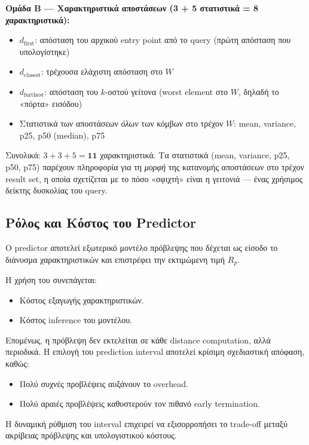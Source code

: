 \documentclass[12pt,a4paper]{article}
\begin{document}
\textbf{Ομάδα Β — Χαρακτηριστικά αποστάσεων (3 + 5 στατιστικά = 8 χαρακτηριστικά):}
\begin{itemize}
    \item $d_{\text{first}}$: απόσταση του αρχικού entry point από το query (πρώτη απόσταση που υπολογίστηκε)
    \item $d_{\text{closest}}$: τρέχουσα ελάχιστη απόσταση στο $W$
    \item $d_{\text{furthest}}$: απόσταση του $k$-οστού γείτονα (worst element στο $W$, δηλαδή το «πόρτα» εισόδου)
    \item Στατιστικά των αποστάσεων \emph{όλων} των κόμβων στο τρέχον $W$: mean, variance, p25, p50 (median), p75
\end{itemize}

Συνολικά: $3 + 3 + 5 = \mathbf{11}$ χαρακτηριστικά. Τα στατιστικά (mean, variance, p25, p50, p75) παρέχουν πληροφορία για τη \emph{μορφή} της κατανομής αποστάσεων στο τρέχον result set, η οποία σχετίζεται με το πόσο «σφιχτή» είναι η γειτονιά — ένας χρήσιμος δείκτης δυσκολίας του query.

\subsection{Ρόλος και Κόστος του Predictor}
Ο predictor αποτελεί εξωτερικό μοντέλο πρόβλεψης που δέχεται ως είσοδο το διάνυσμα χαρακτηριστικών και επιστρέφει την εκτιμώμενη τιμή $R_p$.

Η χρήση του συνεπάγεται:

\begin{itemize}
\item Κόστος εξαγωγής χαρακτηριστικών.
\item Κόστος inference του μοντέλου.
\end{itemize}

Επομένως, η πρόβλεψη δεν εκτελείται σε κάθε distance computation, αλλά περιοδικά. Η επιλογή του prediction interval αποτελεί κρίσιμη σχεδιαστική απόφαση, καθώς:

\begin{itemize}
\item Πολύ συχνές προβλέψεις αυξάνουν το overhead.
\item Πολύ αραιές προβλέψεις καθυστερούν τον πιθανό early termination.
\end{itemize}

Η δυναμική ρύθμιση του interval επιχειρεί να εξισορροπήσει το trade-off μεταξύ ακρίβειας πρόβλεψης και υπολογιστικού κόστους.
\end{document}
